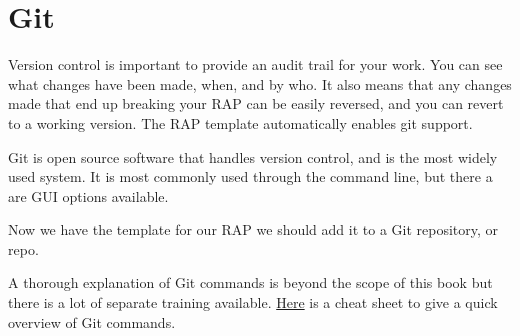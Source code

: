 \documentclass[
  letterpaper,
]{book}
\begin{document}
\hypertarget{git}{%
\section{Git}\label{git}}

Version control is important to provide an audit trail for your work.
You can see what changes have been made, when, and by who. It also means
that any changes made that end up breaking your RAP can be easily
reversed, and you can revert to a working version. The RAP template
automatically enables git support.

Git is open source software that handles version control, and is the
most widely used system. It is most commonly used through the command
line, but there a are GUI options available.

Now we have the template for our RAP we should add it to a Git
repository, or repo.

A thorough explanation of Git commands is beyond the scope of this book
but there is a lot of separate training available.
\href{https://education.github.com/git-cheat-sheet-education.pdf}{Here}
is a cheat sheet to give a quick overview of Git commands.
\end{document}
